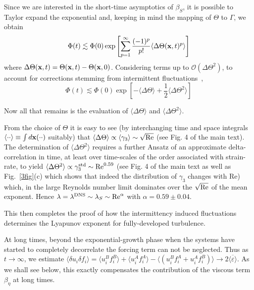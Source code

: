 \documentclass[amsmath,amssymb,amsbsy,pre,twocolumn,tightenlines,superscriptaddress,floatfix]{revtex4-2}
\begin{document}
Since we are interested in the short-time asymptotics of $\beta_S$, it is possible to Taylor expand
the exponential and, keeping in mind the mapping of $\Theta$ to $\Gamma$, we obtain
\begin{equation}
\Phi(t) \lesssim \Phi(0) \exp \left[ \sum_{p = 1}^\infty \frac{(-1)^p}{p!} \langle \Delta \Theta({\bf x}, t)^p\rangle \right]
	\label{eq:exp}
\end{equation}
where $\Delta \Theta({\bf x}, t) = \Theta({\bf x}, t) - \Theta({\bf x}, 0)$.
Considering terms up to $\mathcal{O}(\Delta \Theta^2)$, to account for corrections stemming from intermittent
fluctuations~\cite{BereraPRL},
\begin{equation}
\Phi(t) \lesssim \Phi(0) \exp \left [- \langle \Delta \Theta \rangle + \frac{1}{2}\langle \Delta \Theta^2\rangle \right ]
	\label{eq:2ndorder}
\end{equation}

Now all that remains is the evaluation of $\langle \Delta \Theta \rangle$ and $\langle \Delta \Theta^2\rangle$.

From the choice of $\Theta$ it is easy to see (by interchanging time and space integrals
$\langle \cdot \cdot \rangle \equiv \int d{\bf x} (\cdot \cdot)$ suitably) that $\langle \Delta \Theta \rangle \propto \langle \gamma_3 \rangle \sim  \sqrt{{\rm Re}}$ (see Fig. 4 of the main text). The determination of $\langle \Delta \Theta^2\rangle$
requires a further Ansatz of an approximate delta-correlation in time, at least over time-scales of the order
associated with strain-rate,
to yield  $\langle \Delta \Theta^2\rangle \propto \gamma_3^{\rm std} \sim {\rm Re}^{0.59}$ (see Fig. 4
of the main text as well as Fig.~\ref{3fig}(c) which shows that indeed the distribution of
$\gamma_3$ changes with Re) which, in the large Reynolds number limit dominates over the  $\sqrt{{\rm Re}}$ of the mean exponent.
Hence $\lambda = \lambda^{\rm DNS} \sim \lambda_S \sim {\rm Re}^\alpha$ with $\alpha = 0.59 \pm 0.04$.


This then completes the proof of how the intermittency induced fluctuations determines the Lyapunov exponent
for fully-developed turbulence.


At long times, beyond the exponential-growth phase when the systems have
started to completely decorrelate the forcing term can not be neglected.  Thus
as $t \to \infty$, we estimate   $\langle \delta u_i \delta f_i \rangle =
\langle u^B_i f^B_i \rangle + \langle u^A_i f^A_i \rangle - \langle (u^B_i
f^A_i + u^A_i f^B_i) \rangle \to 2\overline{\langle \varepsilon\rangle}$. As we
shall see below, this exactly compensates the contribution of the viscous term
$\beta_\eta$ at long times.
\end{document}

